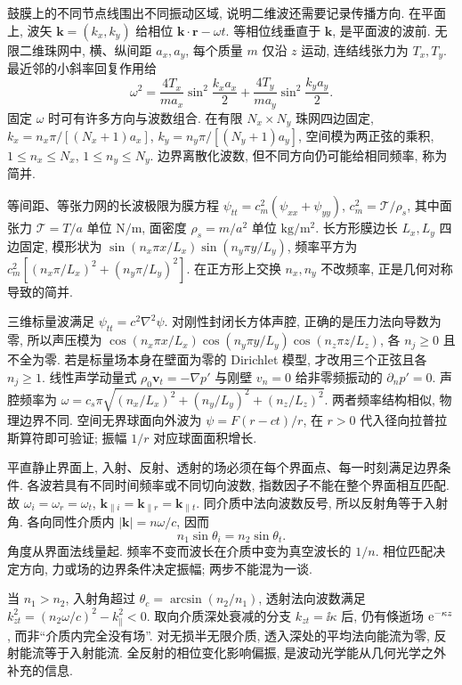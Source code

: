 \label{ch:interface}
鼓膜上的不同节点线围出不同振动区域, 说明二维波还需要记录传播方向. 在平面上, 波矢 $\boldsymbol k=(k_x,k_y)$ 给相位 $\boldsymbol k\cdot\boldsymbol r-\omega t$. 等相位线垂直于 $\boldsymbol k$, 是平面波的波前. 无限二维珠网中, 横、纵间距 $a_x,a_y$, 每个质量 $m$ 仅沿 $z$ 运动, 连结线张力为 $T_x,T_y$. 最近邻的小斜率回复作用给
\[
\omega^2=\frac{4T_x}{ma_x}\sin^2\frac{k_xa_x}2+
\frac{4T_y}{ma_y}\sin^2\frac{k_ya_y}2.
\]
固定 $\omega$ 时可有许多方向与波数组合. 在有限 $N_x\times N_y$ 珠网四边固定, $k_x=n_x\pi/[(N_x+1)a_x]$, $k_y=n_y\pi/[(N_y+1)a_y]$, 空间模为两正弦的乘积, $1\le n_x\le N_x$, $1\le n_y\le N_y$. 边界离散化波数, 但不同方向仍可能给相同频率, 称为简并.

等间距、等张力网的长波极限为膜方程 $\psi_{tt}=c_m^2(\psi_{xx}+\psi_{yy})$, $c_m^2=\mathcal T/\rho_s$, 其中面张力 $\mathcal T=T/a$ 单位 $\mathrm{N/m}$, 面密度 $\rho_s=m/a^2$ 单位 $\mathrm{kg/m^2}$. 长方形膜边长 $L_x,L_y$ 四边固定, 模形状为 $\sin(n_x\pi x/L_x)\sin(n_y\pi y/L_y)$, 频率平方为 $c_m^2[(n_x\pi/L_x)^2+(n_y\pi/L_y)^2]$. 在正方形上交换 $n_x,n_y$ 不改频率, 正是几何对称导致的简并.

三维标量波满足 $\psi_{tt}=c^2\nabla^2\psi$. 对刚性封闭长方体声腔, 正确的是压力法向导数为零, 所以声压模为 $\cos(n_x\pi x/L_x)\cos(n_y\pi y/L_y)\cos(n_z\pi z/L_z)$, 各 $n_j\ge0$ 且不全为零. 若是标量场本身在壁面为零的 Dirichlet 模型, 才改用三个正弦且各 $n_j\ge1$. 线性声学动量式 $\rho_0\boldsymbol v_t=-\nabla p'$ 与刚壁 $v_n=0$ 给非零频振动的 $\partial_np'=0$. 声腔频率为 $\omega=c_s\pi\sqrt{(n_x/L_x)^2+(n_y/L_y)^2+(n_z/L_z)^2}$. 两者频率结构相似, 物理边界不同. 空间无界球面向外波为 $\psi=F(r-ct)/r$, 在 $r>0$ 代入径向拉普拉斯算符即可验证; 振幅 $1/r$ 对应球面面积增长.

平直静止界面上, 入射、反射、透射的场必须在每个界面点、每一时刻满足边界条件. 各波若具有不同时间频率或不同切向波数, 指数因子不能在整个界面相互匹配. 故 $\omega_i=\omega_r=\omega_t$, $\boldsymbol k_{\parallel i}=\boldsymbol k_{\parallel r}=\boldsymbol k_{\parallel t}$. 同介质中法向波数反号, 所以反射角等于入射角. 各向同性介质内 $|\boldsymbol k|=n\omega/c$, 因而
\begin{equation}\label{eq:snell}
n_1\sin\theta_i=n_2\sin\theta_t.
\end{equation}
角度从界面法线量起. 频率不变而波长在介质中变为真空波长的 $1/n$. 相位匹配决定方向, 力或场的边界条件决定振幅; 两步不能混为一谈.

当 $n_1>n_2$, 入射角超过 $\theta_c=\arcsin(n_2/n_1)$, 透射法向波数满足 $k_{zt}^2=(n_2\omega/c)^2-k_\parallel^2<0$. 取向介质深处衰减的分支 $k_{zt}=\ii\kappa$ 后, 仍有倏逝场 $\mathrm e^{-\kappa z}$, 而非“介质内完全没有场”. 对无损半无限介质, 透入深处的平均法向能流为零, 反射能流等于入射能流. 全反射的相位变化影响偏振, 是波动光学能从几何光学之外补充的信息.

